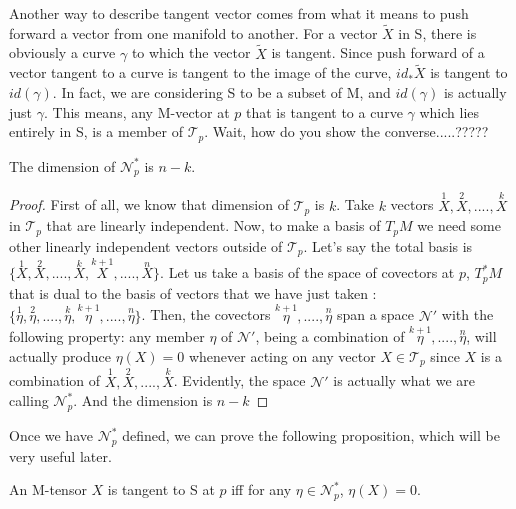 Another way to describe tangent vector comes from what it means to push forward a vector from one manifold to another. For a vector $ \tilde{X}$ in S, there is obviously a curve $ \gamma$ to which the vector $ \tilde{X}$ is tangent. Since push forward of a vector tangent to a curve is tangent to the image of the curve, $ id_* \tilde{X}$ is tangent to $ id( \gamma)$. In fact, we are considering S to be a subset of M, and $ id( \gamma)$ is actually just $ \gamma$. This means, any M-vector at $p$ that is tangent to a curve $ \gamma$ which lies entirely in S, is a member of $ \mathscr{T}_p$.
Wait, how do you show the converse.....?????


\begin{proposition}
    The dimension of $\mathscr{N}^*_p$ is $n-k$.
\end{proposition}

\begin{proof}
    First of all, we know that dimension of $\mathscr{T}_p$ is $k$. Take $k$ vectors $\overset{1}{X}, \overset{2}{X},....,\overset{k}{X}$ in $\mathscr{T}_p$ that are linearly independent. Now, to make a basis of $T_pM$ we need some other linearly independent vectors outside of $\mathscr{T}_p$. Let's say the total basis is   $\{\overset{1}{X}, \overset{2}{X},....,\overset{k}{X},\overset{k+1}{X},....,\overset{n}{X}\}$. Let us take a basis of the space of covectors at $ p$, $ T^*_pM$ that is dual to the basis of vectors that we have just taken : $\{\overset{1}{\eta}, \overset{2}{\eta},....,\overset{k}{\eta},\overset{k+1}{\eta},....,\overset{n}{\eta}\}$. Then, the covectors $\overset{k+1}{\eta},....,\overset{n}{\eta}$ span a space $\mathscr{N}'$ with the following property: any member $\eta$ of $\mathscr{N}'$, being a combination of $\overset{k+1}{\eta},....,\overset{n}{\eta}$, will actually produce $\eta(X)=0$ whenever acting on any vector $X \in \mathscr{T}_p$ since $ X $  is a combination of $\overset{1}{X}, \overset{2}{X},....,\overset{k}{X}$. Evidently, the space $\mathscr{N}'$ is actually what we are calling $\mathscr{N}^*_p$. And the dimension is $n-k$
\end{proof}

Once we have $\mathscr{N}^*_p$ defined, we can prove the following proposition, which will be very useful later.


\begin{proposition}
    An M-tensor $ X$ is tangent to S at $ p$ iff for any $\eta \in \mathscr{N}^*_p$, $\eta(X)=0$.
\end{proposition}

